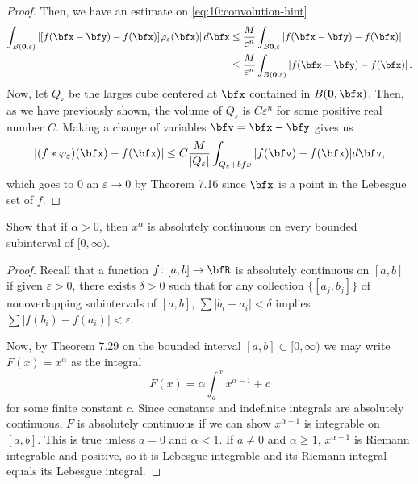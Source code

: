 \begin{proof}
Then, we have an estimate on \eqref{eq:10:convolution-hint}
\begin{equation}
\label{eq:10:better-estimate}
\begin{aligned}
\int_{B(\mathbf{0},\varepsilon)}\left|{[f(\bfx-\bfy)-f(\bfx)]\varphi_\varepsilon(\bfx)}\right|d\bfx
&\leq\frac{M}{\varepsilon^n}\int_{B\mathbf{0},\varepsilon}\left|f(\bfx-\bfy)-f(\bfx)\right|\\
&\leq\frac{M}{\varepsilon^n}\int_{B(\mathbf{0},\varepsilon)}\left|f(\bfx-\bfy)-f(\bfx)\right|.
\end{aligned}
\end{equation}
Now, let $Q_\varepsilon$ be the larges cube centered at $\bfx$ contained in
$B(\mathbf{0},\bfx)$. Then, as we have previously shown, the volume of
$Q_\varepsilon$ is $C\varepsilon^n$ for some positive real number
$C$. Making a change of variables $\bfv=\bfx-\bfy$ gives us
\begin{equation}
\label{eq:10:change-of-var}
|(f*\varphi_\varepsilon)(\bfx)-f(\bfx)|
\leq C\frac{M}{|Q_\varepsilon|}\int_{Q_\varepsilon+bfx}|f(\bfv)-f(\bfx)|d\bfv,
\end{equation}
which goes to $0$ an $\varepsilon\to 0$ by Theorem 7.16 since $\bfx$ is a
point in the Lebesgue set of $f$.
\end{proof}
\newpage

\begin{problem}
Show that if $\alpha>0$, then $x^\alpha$ is absolutely continuous on every
bounded subinterval of $[0,\infty)$.
\end{problem}
\begin{proof}
Recall that a function $f\colon[a,b]\to\bfR$ is absolutely continuous on
$[a,b]$ if given $\varepsilon>0$, there exists $\delta>0$ such that for any
collection $\{{[a_j,b_j]}\}$ of nonoverlapping subintervals of $[a,b]$,
$\sum|b_i-a_i|<\delta$ implies $\sum|f(b_i)-f(a_i)|<\varepsilon$.

Now, by Theorem 7.29 on the bounded interval $[a,b]\subset[0,\infty)$ we
may write $F(x)=x^\alpha$ as the integral
\begin{equation}
\label{eq:10:int-rep}
F(x)=\alpha\int_a^xx^{\alpha-1}+c
\end{equation}
for some finite constant $c$. Since constants and indefinite integrals are
absolutely continuous, $F$ is absolutely continuous if we can show
$x^{\alpha-1}$ is integrable on $[a,b]$. This is true unless $a=0$ and
$\alpha<1$. If $a\neq 0$ and $\alpha\geq 1$, $x^{\alpha-1}$ is Riemann
integrable and positive, so it is Lebesgue integrable and its Riemann
integral equals its Lebesgue integral.
\end{proof}
\newpage

